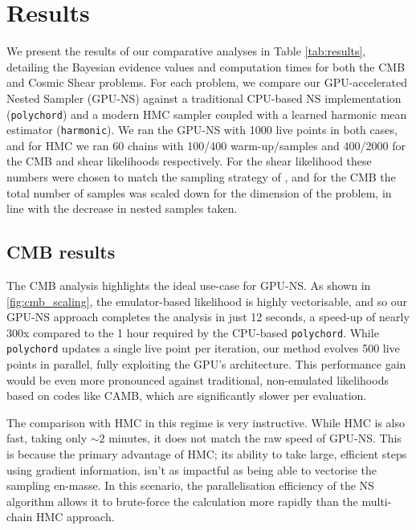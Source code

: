 \documentclass[twocolumn]{openjournal}
\begin{document}
\section{Results}
\label{sec:results}
We present the results of our comparative analyses in Table \ref{tab:results}, detailing the Bayesian evidence values and computation times for both the CMB and Cosmic Shear problems. For each problem, we compare our GPU-accelerated Nested Sampler (GPU-NS) against a traditional CPU-based NS implementation (\texttt{polychord}) and a modern HMC sampler coupled with a learned harmonic mean estimator (\texttt{harmonic}). We ran the GPU-NS with 1000 live points in both cases, and for HMC we ran 60 chains with 100/400 warm-up/samples and 400/2000 for the CMB and shear likelihoods respectively. For the shear likelihood these numbers were chosen to match the sampling strategy of \cite{Piras_2024}, and for the CMB the total number of samples was scaled down for the dimension of the problem, in line with the decrease in nested samples taken. 

\subsection{CMB results}
The CMB analysis highlights the ideal use-case for GPU-NS. As shown in \cref{fig:cmb_scaling}, the emulator-based likelihood is highly vectorisable, and so our GPU-NS approach completes the analysis in just 12 seconds, a speed-up of nearly 300x compared to the 1 hour required by the CPU-based \texttt{polychord}. While \texttt{polychord} updates a single live point per iteration, our method evolves 500 live points in parallel, fully exploiting the GPU's architecture. This performance gain would be even more pronounced against traditional, non-emulated likelihoods based on codes like CAMB, which are significantly slower per evaluation.

The comparison with HMC in this regime is very instructive. While HMC is also fast, taking only $\sim2$ minutes, it does not match the raw speed of GPU-NS. This is because the primary advantage of HMC; its ability to take large, efficient steps using gradient information, isn't as impactful as being able to vectorise the sampling en-masse. In this scenario, the parallelisation efficiency of the NS algorithm allows it to brute-force the calculation more rapidly than the multi-chain HMC approach.
\end{document}
